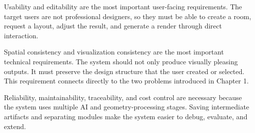 Usability and editability are the most important user-facing requirements. The target users are not professional designers, so they must be able to create a room, request a layout, adjust the result, and generate a render through direct interaction.

Spatial consistency and visualization consistency are the most important technical requirements. The system should not only produce visually pleasing outputs. It must preserve the design structure that the user created or selected. This requirement connects directly to the two problems introduced in Chapter 1.

Reliability, maintainability, traceability, and cost control are necessary because the system uses multiple AI and geometry-processing stages. Saving intermediate artifacts and separating modules make the system easier to debug, evaluate, and extend.
